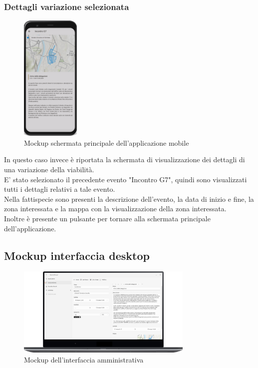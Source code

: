 \documentclass{article}
\begin{document}
\subsubsection{Dettagli variazione selezionata}
\begin{figure}[htbp]
    \centering
    \includegraphics[width=0.25\textwidth]{Images/Mockup2 - Mobile.png}
    \caption{Mockup schermata principale dell'applicazione mobile}
\end{figure}

In questo caso invece è riportata la schermata di visualizzazione dei dettagli di una variazione della viabilità.\\
E' stato selezionato il precedente evento "Incontro G7", quindi sono visualizzati tutti i dettagli relativi a tale evento.\\
Nella fattispecie sono presenti la descrizione dell'evento, la data di inizio e fine, la zona interessata e la mappa con la visualizzazione della zona interessata.\\
Inoltre è presente un pulsante per tornare alla schermata principale dell'applicazione.\\


\clearpage

\subsection{Mockup interfaccia desktop}
\begin{figure}[htbp]
    \centering
    \includegraphics[width=0.75\textwidth]{Images/Mockup1 - Desktop.png}
    \caption{Mockup dell'interfaccia amministrativa}
\end{figure}
\clearpage
\end{document}

